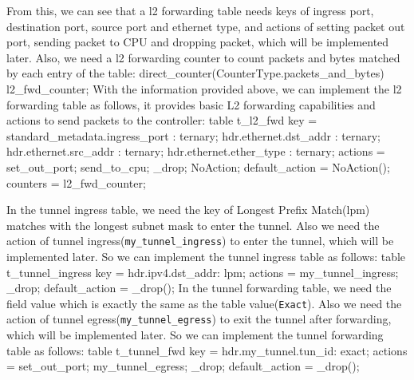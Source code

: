 \documentclass{article}%
\newenvironment{code}%
   {\snugshade\verbatim}%
   {\endverbatim\endsnugshade}
\begin{document}
\begin{Large}
From this, we can see that a l2 forwarding table needs keys of ingress port, destination port, source port and ethernet type, and actions of setting packet out port, sending packet to CPU and dropping packet, which will be implemented later.
\newpage
Also, we need a l2 forwarding counter to count packets and bytes matched by each entry of the table:
\begin{code}
    direct_counter(CounterType.packets_and_bytes) l2_fwd_counter;
\end{code}
With the information provided above, we can implement the l2 forwarding table as follows, it provides basic L2 forwarding capabilities and actions to send packets to the controller:
\begin{code}
    table t_l2_fwd {
        key = {
            standard_metadata.ingress_port  : ternary;
            hdr.ethernet.dst_addr           : ternary;
            hdr.ethernet.src_addr           : ternary;
            hdr.ethernet.ether_type         : ternary;
        }
        actions = {
            set_out_port;
            send_to_cpu;
            _drop;
            NoAction;
        }
        default_action = NoAction();
        counters = l2_fwd_counter;
    }
\end{code}

In the tunnel ingress table, we need the key of Longest Prefix Match(lpm) matches with the longest subnet mask to enter the tunnel. Also we need the action of tunnel ingress(\texttt{my\_tunnel\_ingress}) to enter the tunnel, which will be implemented later. So we can implement the tunnel ingress table as follows:
\begin{code}
    table t_tunnel_ingress {
        key = { hdr.ipv4.dst_addr: lpm; }
        actions = {
            my_tunnel_ingress;
            _drop;
        }
        default_action = _drop();
    }
\end{code}
\newpage
In the tunnel forwarding table, we need the field value which is exactly the same as the table value(\texttt{Exact}). Also we need the action of tunnel egress(\texttt{my\_tunnel\_egress}) to exit the tunnel after forwarding, which will be implemented later. So we can implement the tunnel forwarding table as follows:
\begin{code}
    table t_tunnel_fwd {
        key = {
            hdr.my_tunnel.tun_id: exact;
        }
        actions = {
            set_out_port;
            my_tunnel_egress;
            _drop;
        }
        default_action = _drop();
    }
\end{code}


\end{Large}
\end{document}
